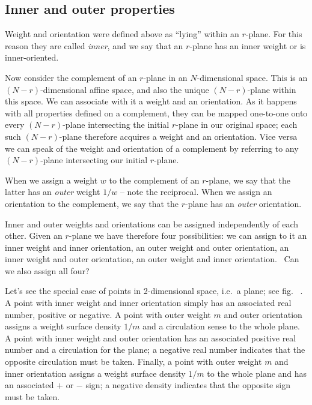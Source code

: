 \documentclass[\ifafour a4paper,12pt,\else a5paper,10pt,\fi%
onecolumn,oneside,article,%
british%
]{memoir}
\theoremstyle{remark}
\theoremstyle{innote}
\renewcommand*{\|}{\nonscript\,\vert\nonscript\;\mathopen{}}
\newcommand*{\fig}{fig.}%
\newcommand*{\ie}{{i.e.}}
\newcommand*{\puzzle}{{\fontencoding{U}\fontfamily{fontawesometwo}\selectfont\symbol{225}}}
\newcommand{\mynote}[1]{ {\color{notecolour}\puzzle\ #1}}
\newcommand*{\yr}{r}
\newcommand*{\yN}{N}
\newcommand*{\yw}{w}
\newcommand*{\ym}{m}
\begin{document}
\subsection{Inner and outer properties}
\label{sec:inner_outer_properties}

Weight and orientation were defined above as \enquote{lying} within an
$\yr$-plane. For this reason they are called \emph{inner}, and we say that
an $\yr$-plane has an inner weight or is inner-oriented.

Now consider the complement of an $\yr$-plane in an $\yN$-dimensional
space. This is an $(\yN-\yr)$-dimensional affine space, and also the unique
$(\yN-\yr)$-plane within this space. We can associate with it a weight and an
orientation. As it happens with all properties defined on a complement, they
can be mapped one-to-one onto every $(\yN-\yr)$-plane intersecting the
initial $\yr$-plane in our original space; each such $(\yN-\yr)$-plane
therefore acquires a weight and an orientation. Vice versa we can
speak of the weight and orientation of a complement by referring to any
$(\yN-\yr)$-plane intersecting our initial $\yr$-plane.

When we assign a weight $\yw$ to the complement of an $\yr$-plane, we say
that the latter has an \emph{outer} weight $1/\yw$ -- note the reciprocal.
When we assign an orientation to the complement, we say that the
$\yr$-plane has an \emph{outer} orientation.

Inner and outer weights and orientations can be assigned independently of
each other. Given an $\yr$-plane we have therefore four possibilities: we
can assign to it an inner weight and inner orientation, an outer weight and
outer orientation, an inner weight and outer orientation, an outer weight
and inner orientation. \mynote{Can we also assign all four?}

Let's see the special case of points in 2-dimensional space, \ie\ a plane;
see \fig\mynote{}. A point with inner weight and inner orientation simply
has an associated real number, positive or negative. A point with outer
weight $\ym$ and outer orientation assigns a weight surface density $1/\ym$
and a circulation sense to the whole plane. A point with inner weight and
outer orientation has an associated positive real number and a circulation
for the plane; a negative real number indicates that the opposite
circulation must be taken. Finally, a point with outer weight $\ym$ and
inner orientation assigns a weight surface density $1/\ym$ to the whole
plane and has an associated $+$ or $-$ sign; a negative density indicates
that the opposite sign must be taken.
\end{document}
